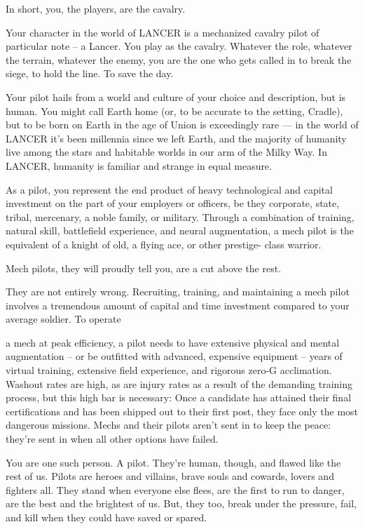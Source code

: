 In short, you, the players, are the cavalry. 

Your character in the world of LANCER is a mechanized cavalry pilot of particular note -- a  
Lancer. You play as the cavalry. Whatever the role, whatever the terrain, whatever the enemy,  
you are the one who gets called in to break the siege, to hold the line. To save the day. 
 

Your pilot hails from a world and culture of your choice and description, but is human. You might  
call Earth home (or, to be accurate to the setting, Cradle), but to be born on Earth in the age of  
Union is exceedingly rare — in the world of LANCER it’s been millennia since we left Earth, and  
the majority of humanity live among the stars and habitable worlds in our arm of the Milky Way.  
In LANCER, humanity is familiar and strange in equal measure.
 

As a pilot, you represent the end product of heavy technological and capital investment on the  
part of your employers or officers, be they corporate, state, tribal, mercenary, a noble family, or  
military. Through a combination of training, natural skill, battlefield experience, and neural  
augmentation, a mech pilot is the equivalent of a knight of old, a flying ace, or other prestige- 
class warrior. 
 

Mech pilots, they will proudly tell you, are a cut above the rest. 
 

They are not entirely wrong. Recruiting, training, and maintaining a mech pilot involves a  
tremendous amount of capital and time investment compared to your average soldier. To operate  

                                                                                                                   


a mech at peak efficiency, a pilot needs to have extensive physical and mental augmentation --  
or be outfitted with advanced, expensive equipment -- years of virtual training, extensive field  
experience, and rigorous zero-G acclimation. Washout rates are high, as are injury rates as a  
result of the demanding training process, but this high bar is necessary: Once a candidate has  
attained their final certifications and has been shipped out to their first post, they face only the  
most dangerous missions. Mechs and their pilots aren’t sent in to keep the peace: they’re sent in  
when all other options have failed. 
 

You are one such person. A pilot. They’re human, though, and flawed like the rest of us. Pilots  
are heroes and villains, brave souls and cowards, lovers and fighters all. They stand when  
everyone else flees, are the first to run to danger, are the best and the brightest of us. But, they  
too, break under the pressure, fail, and kill when they could have saved or spared. 
 

